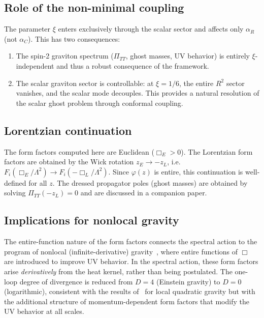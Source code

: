\documentclass[aps,prd,twocolumn,superscriptaddress,nofootinbib,floatfix]{revtex4-2}
\begin{document}
\subsection{Role of the non-minimal coupling}

The parameter $\xi$ enters exclusively through the scalar sector and affects
only $\alpha_R$ (not $\alpha_C$). This has two consequences:
\begin{enumerate}
\item The spin-2 graviton spectrum ($\Pi_{TT}$, ghost masses, UV behavior) is
  entirely $\xi$-independent and thus a robust consequence of the framework.
\item The scalar graviton sector is controllable: at $\xi = 1/6$, the entire
  $R^2$ sector vanishes, and the scalar mode decouples. This provides a natural
  resolution of the scalar ghost problem through conformal coupling.
\end{enumerate}

\subsection{Lorentzian continuation}

The form factors computed here are Euclidean ($\Box_E > 0$). The Lorentzian
form factors are obtained by the Wick rotation $z_E \to -z_L$, i.e.\
$F_i(\Box_E/\Lambda^2) \to F_i(-\Box_L/\Lambda^2)$. Since $\varphi(z)$ is
entire, this continuation is well-defined for all $z$. The dressed propagator
poles (ghost masses) are obtained by solving $\Pi_{TT}(-z_L) = 0$ and are
discussed in a companion paper.

\subsection{Implications for nonlocal gravity}

The entire-function nature of the form factors connects the spectral action
to the program of nonlocal (infinite-derivative)
gravity~\cite{Modesto:2011kw,Tomboulis:1997gg,Biswas:2011ar}, where entire
functions of $\Box$ are introduced to improve UV behavior. In the spectral
action, these form factors arise \emph{derivatively} from the heat kernel,
rather than being postulated. The one-loop degree of divergence is reduced from
$D = 4$ (Einstein gravity) to $D = 0$ (logarithmic), consistent with the
results of~\cite{Stelle:1976gc} for local quadratic gravity but with the
additional structure of momentum-dependent form factors that modify the UV
behavior at all scales.
\end{document}
